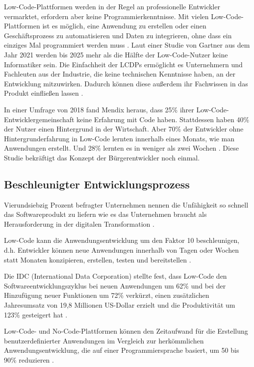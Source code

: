 \documentclass[12pt]{article} %
\begin{document}
	Low-Code-Plattformen werden in der Regel an professionelle Entwickler vermarktet, erfordern aber keine Programmierkenntnisse. Mit vielen Low-Code-Plattformen ist es möglich, eine Anwendung zu erstellen oder einen Geschäftsprozess zu automatisieren und Daten zu integrieren, ohne dass ein einziges Mal programmiert werden muss \autocite{MichelleGardner.2022}. Laut einer Studie von Gartner aus dem Jahr 2021 werden bis 2025 mehr als die Hälfte der Low-Code-Nutzer keine Informatiker sein. Die Einfachheit der LCDPs ermöglicht es Unternehmern und Fachleuten aus der Industrie, die keine technischen Kenntnisse haben, an der Entwicklung mitzuwirken. Dadurch können diese außerdem ihr Fachwissen in das Produkt einfließen lassen \autocite{OleksiiGlib.2022}.
	
	In einer Umfrage von 2018 fand Mendix heraus, dass 25\% ihrer Low-Code-Entwicklergemeinschaft keine Erfahrung mit Code haben. Stattdessen haben 40\% der Nutzer einen Hintergrund in der Wirtschaft. Aber 70\% der Entwickler ohne Hintergrunderfahrung in Low-Code lernten innerhalb eines Monats, wie man Anwendungen erstellt. Und 28\% lernten es in weniger als zwei Wochen \autocite{KevinShuler.2023}. Diese Studie bekräftigt das Konzept der Bürgerentwickler noch einmal.
	
	\subsection{Beschleunigter Entwicklungsprozess}	\label{faster}
	Vierundsiebzig Prozent befragter Unternehmen nennen die Unfähigkeit so schnell das Softwareprodukt zu liefern wie es das Unternehmen braucht als Herausforderung in der digitalen Transformation \autocite{EmmaVanPelt.2019}. \newline %
	
	Low-Code kann die Anwendungsentwicklung um den Faktor 10 beschleunigen, d.h. Entwickler können neue Anwendungen innerhalb von Tagen oder Wochen statt Monaten konzipieren, erstellen, testen und bereitstellen \autocite{KevinShuler.2023}.
	
	Die IDC (International Data Corporation) stellte fest, dass Low-Code den Softwareentwicklungszyklus bei neuen Anwendungen um 62\% und bei der Hinzufügung neuer Funktionen um 72\% verkürzt, einen zusätzlichen Jahresumsatz von 19,8 Millionen US-Dollar erzielt und die Produktivität um 123\% gesteigert hat \autocite{KevinShuler.2023}.
	
	Low-Code- und No-Code-Plattformen können den Zeitaufwand für die Erstellung benutzerdefinierter Anwendungen im Vergleich zur herkömmlichen Anwendungsentwicklung, die auf einer Programmiersprache basiert, um 50 bis 90\% reduzieren \autocite{KevinShuler.2023}.
		
\end{document}
